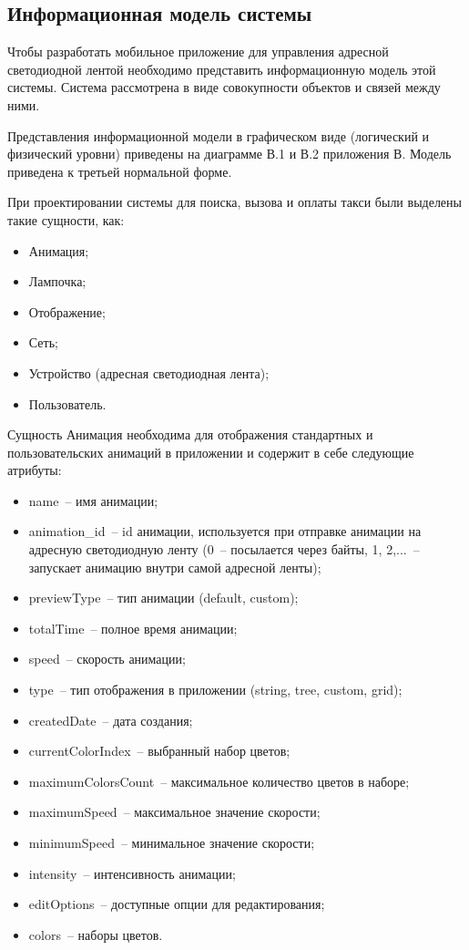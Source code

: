 \subsection{Информационная модель системы}
\label{sec:develop:umlDiagrams}

Чтобы разработать мобильное приложение для управления адресной светодиодной лентой необходимо представить информационную модель этой системы. Система рассмотрена в виде совокупности объектов и связей между ними. 

Представления информационной модели в графическом виде (логический и физический уровни) приведены на диаграмме В.1 и В.2 приложения В. Модель приведена к третьей нормальной форме.

При проектировании системы для поиска, вызова и оплаты такси были выделены такие сущности, как:
\begin{itemize}
	\item Анимация;
	\item Лампочка;
	\item Отображение;
	\item Сеть;
	\item Устройство (адресная светодиодная лента);
	\item Пользователь.
\end{itemize}

Сущность Анимация необходима для отображения стандартных и пользовательских анимаций в приложении и содержит в себе следующие атрибуты:
\begin{itemize}
	\item name~-- имя анимации;
	\item animation\_id~-- id анимации, используется при отправке анимации на адресную светодиодную ленту (0~-- посылается через байты, 1, 2,...~-- запускает анимацию внутри самой адресной ленты);
	\item previewType~-- тип анимации (default, custom);
	\item totalTime~-- полное время анимации;
	\item speed~-- скорость анимации;
	\item type~-- тип отображения в приложении (string, tree, custom, grid);
	\item createdDate~-- дата создания;
	\item currentColorIndex~-- выбранный набор цветов;
	\item maximumColorsCount~-- максимальное количество цветов в наборе;
	\item maximumSpeed~-- максимальное значение скорости;
	\item minimumSpeed~-- минимальное значение скорости;
	\item intensity~-- интенсивность анимации;
	\item editOptions~-- доступные опции для редактирования;
	\item colors~-- наборы цветов.
\end{itemize}

